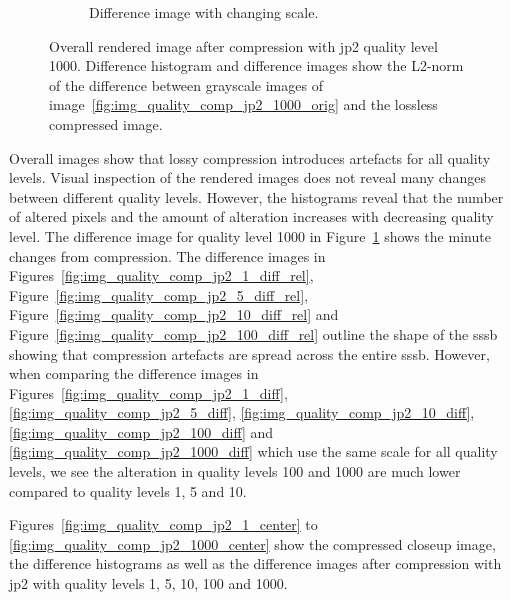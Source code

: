 \begin{figure}[htb]
\begin{subfigure}[b]{0.48\textwidth}
        \caption{Difference image with changing scale.}
        \label{fig:img_quality_comp_jp2_1000_diff_rel}
    \end{subfigure}
    \caption{Overall rendered image after compression with \gls{jp2} quality level 1000. Difference histogram and difference images show the L2-norm of the difference between grayscale images of image~\ref{fig:img_quality_comp_jp2_1000_orig} and the lossless compressed image.}
    \label{fig:img_quality_comp_jp2_1000}
\end{figure}

Overall images show that lossy compression introduces artefacts for all quality levels. Visual inspection of the rendered images does not reveal many changes between different quality levels. However, the histograms reveal that the number of altered pixels and the amount of alteration increases with decreasing quality level. The difference image for quality level 1000 in Figure~\ref{fig:img_quality_comp_jp2_1000_diff_rel} shows the minute changes from compression. The difference images in Figures~\ref{fig:img_quality_comp_jp2_1_diff_rel}, Figure~\ref{fig:img_quality_comp_jp2_5_diff_rel}, Figure~\ref{fig:img_quality_comp_jp2_10_diff_rel} and Figure~\ref{fig:img_quality_comp_jp2_100_diff_rel} outline the shape of the \gls{sssb} showing that compression artefacts are spread across the entire \gls{sssb}. However, when comparing the difference images in Figures~\ref{fig:img_quality_comp_jp2_1_diff}, \ref{fig:img_quality_comp_jp2_5_diff}, \ref{fig:img_quality_comp_jp2_10_diff}, \ref{fig:img_quality_comp_jp2_100_diff} and \ref{fig:img_quality_comp_jp2_1000_diff} which use the same scale for all quality levels, we see the alteration in quality levels \SI{100}{} and \SI{1000}{} are much lower compared to quality levels \SI{1}{}, \SI{5}{} and \SI{10}{}.

Figures~\ref{fig:img_quality_comp_jp2_1_center} to \ref{fig:img_quality_comp_jp2_1000_center} show the compressed closeup image, the difference histograms as well as the difference images after compression with \gls{jp2} with quality levels \SI{1}{}, \SI{5}{}, \SI{10}{}, \SI{100}{} and \SI{1000}{}.

